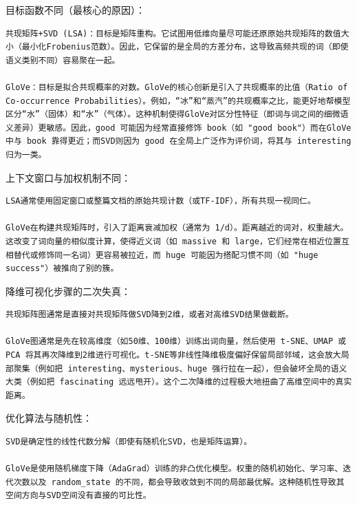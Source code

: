 \documentclass[11pt]{article}
\begin{document}
目标函数不同（最核心的原因）：

\begin{verbatim}
共现矩阵+SVD (LSA)：目标是矩阵重构。它试图用低维向量尽可能还原原始共现矩阵的数值大小（最小化Frobenius范数）。因此，它保留的是全局的方差分布，这导致高频共现的词（即使语义类别不同）容易聚在一起。

GloVe：目标是拟合共现概率的对数。GloVe的核心创新是引入了共现概率的比值（Ratio of Co-occurrence Probabilities）。例如，“冰”和“蒸汽”的共现概率之比，能更好地帮模型区分“水”（固体）和“水”（气体）。这种机制使得GloVe对区分性特征（即词与词之间的细微语义差异）更敏感。因此，good 可能因为经常直接修饰 book（如 "good book"）而在GloVe中与 book 靠得更近；而SVD则因为 good 在全局上广泛作为评价词，将其与 interesting 归为一类。
\end{verbatim}

上下文窗口与加权机制不同：

\begin{verbatim}
LSA通常使用固定窗口或整篇文档的原始共现计数（或TF-IDF），所有共现一视同仁。

GloVe在构建共现矩阵时，引入了距离衰减加权（通常为 1/d）。距离越近的词对，权重越大。这改变了词向量的相似度计算，使得近义词（如 massive 和 large，它们经常在相近位置互相替代或修饰同一名词）更容易被拉近，而 huge 可能因为搭配习惯不同（如 "huge success"）被推向了别的簇。
\end{verbatim}

降维可视化步骤的二次失真：

\begin{verbatim}
共现矩阵图通常是直接对共现矩阵做SVD降到2维，或者对高维SVD结果做截断。

GloVe图通常是先在较高维度（如50维、100维）训练出词向量，然后使用 t-SNE、UMAP 或 PCA 将其再次降维到2维进行可视化。t-SNE等非线性降维极度偏好保留局部邻域，这会放大局部聚集（例如把 interesting、mysterious、huge 强行拉在一起），但会破坏全局的语义大类（例如把 fascinating 远远甩开）。这个二次降维的过程极大地扭曲了高维空间中的真实距离。
\end{verbatim}

优化算法与随机性：

\begin{verbatim}
SVD是确定性的线性代数分解（即使有随机化SVD，也是矩阵运算）。

GloVe是使用随机梯度下降（AdaGrad）训练的非凸优化模型。权重的随机初始化、学习率、迭代次数以及 random_state 的不同，都会导致收敛到不同的局部最优解。这种随机性导致其空间方向与SVD空间没有直接的可比性。
\end{verbatim}
\end{document}
